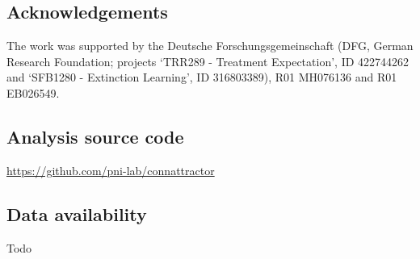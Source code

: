 \documentclass{article}
\begin{document}
\subsection{Acknowledgements}\label{Acknowledgements}

The work was supported by the Deutsche Forschungsgemeinschaft (DFG, German Research Foundation; projects `TRR289 - Treatment Expectation', ID 422744262 and `SFB1280 - Extinction Learning', ID 316803389), R01 MH076136 and R01 EB026549.

\subsection{Analysis source code}\label{Analysis source code}

\href{https://github.com/pni-lab/connattractor}{https://github.com/pni-lab/connattractor}

\subsection{Data availability}\label{Data availability}

Todo
\printglossaries





\end{document}
